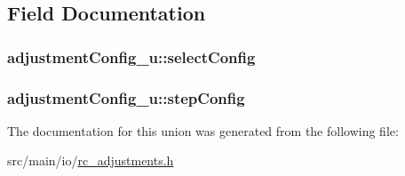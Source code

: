\subsection{Field Documentation}
\hypertarget{unionadjustmentConfig__u_ad4390baf406e0f010b032ef9a3d72ddb}{
\subsubsection[{select\+Config}]{ adjustment\+Config\+\_\+u\+::select\+Config}}\label{unionadjustmentConfig__u_ad4390baf406e0f010b032ef9a3d72ddb}
\hypertarget{unionadjustmentConfig__u_aec7578f418f21a51cab1f8b217117b94}{
\subsubsection[{step\+Config}]{ adjustment\+Config\+\_\+u\+::step\+Config}}\label{unionadjustmentConfig__u_aec7578f418f21a51cab1f8b217117b94}


The documentation for this union was generated from the following file\+:\begin{DoxyCompactItemize}
\item 
src/main/io/\hyperlink{io_2rc__adjustments_8h}{rc\+\_\+adjustments.\+h}\end{DoxyCompactItemize}
